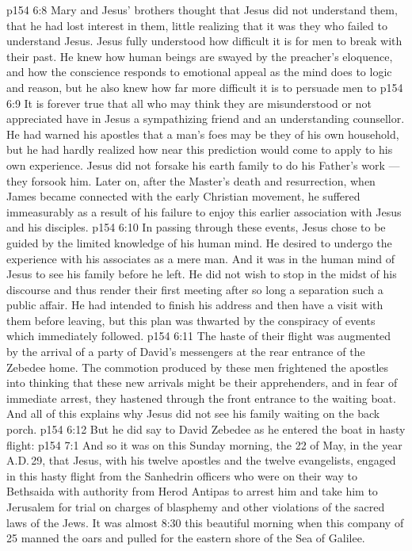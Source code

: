 \vs p154 6:8 \pc Mary and Jesus’ brothers thought that Jesus did not understand them, that he had lost interest in them, little realizing that it was they who failed to understand Jesus. Jesus fully understood how difficult it is for men to break with their past. He knew how human beings are swayed by the preacher’s eloquence, and how the conscience responds to emotional appeal as the mind does to logic and reason, but he also knew how far more difficult it is to persuade men to 
\vs p154 6:9 It is forever true that all who may think they are misunderstood or not appreciated have in Jesus a sympathizing friend and an understanding counsellor. He had warned his apostles that a man’s foes may be they of his own household, but he had hardly realized how near this prediction would come to apply to his own experience. Jesus did not forsake his earth family to do his Father’s work --- they forsook him. Later on, after the Master’s death and resurrection, when James became connected with the early Christian movement, he suffered immeasurably as a result of his failure to enjoy this earlier association with Jesus and his disciples.
\vs p154 6:10 \pc In passing through these events, Jesus chose to be guided by the limited knowledge of his human mind. He desired to undergo the experience with his associates as a mere man. And it was in the human mind of Jesus to see his family before he left. He did not wish to stop in the midst of his discourse and thus render their first meeting after so long a separation such a public affair. He had intended to finish his address and then have a visit with them before leaving, but this plan was thwarted by the conspiracy of events which immediately followed.
\vs p154 6:11 The haste of their flight was augmented by the arrival of a party of David’s messengers at the rear entrance of the Zebedee home. The commotion produced by these men frightened the apostles into thinking that these new arrivals might be their apprehenders, and in fear of immediate arrest, they hastened through the front entrance to the waiting boat. And all of this explains why Jesus did not see his family waiting on the back porch.
\vs p154 6:12 But he did say to David Zebedee as he entered the boat in hasty flight: 
\vs p154 7:1 And so it was on this Sunday morning, the 22 of May, in the year A.D.\,29, that Jesus, with his twelve apostles and the twelve evangelists, engaged in this hasty flight from the Sanhedrin officers who were on their way to Bethsaida with authority from Herod Antipas to arrest him and take him to Jerusalem for trial on charges of blasphemy and other violations of the sacred laws of the Jews. It was almost 8:30 this beautiful morning when this company of 25 manned the oars and pulled for the eastern shore of the Sea of Galilee.
